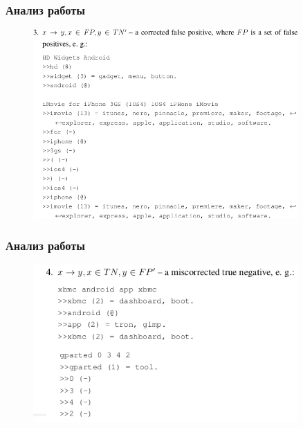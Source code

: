 \begin{frame}
\frametitle{Анализ работы}

\begin{figure}
\centering
\includegraphics[width=0.9\textwidth]{figures/2}
\end{figure}
\end{frame}




\begin{frame}
\frametitle{Анализ работы}

\begin{figure}
\centering
\includegraphics[width=0.9\textwidth]{figures/4}
\end{figure}
\end{frame}






